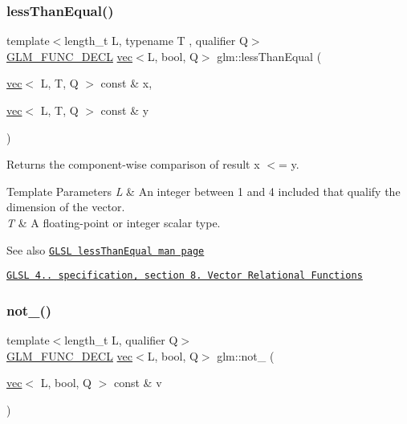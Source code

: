 \subsubsection{\texorpdfstring{less\+Than\+Equal()}{lessThanEqual()}}
{\footnotesize\ttfamily template$<$length\+\_\+t L, typename T , qualifier Q$>$ \\
\hyperlink{setup_8hpp_ab2d052de21a70539923e9bcbf6e83a51}{G\+L\+M\+\_\+\+F\+U\+N\+C\+\_\+\+D\+E\+CL} \hyperlink{structglm_1_1vec}{vec}$<$L, bool, Q$>$ glm\+::less\+Than\+Equal (\begin{DoxyParamCaption}\item[{\hyperlink{structglm_1_1vec}{vec}$<$ L, T, Q $>$ const \&}]{x,  }\item[{\hyperlink{structglm_1_1vec}{vec}$<$ L, T, Q $>$ const \&}]{y }\end{DoxyParamCaption})}

Returns the component-\/wise comparison of result x $<$= y.


\begin{DoxyTemplParams}{Template Parameters}
{\em L} & An integer between 1 and 4 included that qualify the dimension of the vector. \\
\hline
{\em T} & A floating-\/point or integer scalar type.\\
\hline
\end{DoxyTemplParams}
\begin{DoxySeeAlso}{See also}
\href{http://www.opengl.org/sdk/docs/manglsl/xhtml/lessThanEqual.xml}{\tt G\+L\+SL less\+Than\+Equal man page} 

\href{http://www.opengl.org/registry/doc/GLSLangSpec.4.20.8.pdf}{\tt G\+L\+SL 4.. specification, section 8. Vector Relational Functions} 
\end{DoxySeeAlso}
\mbox{\label{group__core__func__vector__relational_ga464f1392c934f69a917ab8bb6eda5b09}} 
\subsubsection{\texorpdfstring{not\+\_\+()}{not\_()}}
{\footnotesize\ttfamily template$<$length\+\_\+t L, qualifier Q$>$ \\
\hyperlink{setup_8hpp_ab2d052de21a70539923e9bcbf6e83a51}{G\+L\+M\+\_\+\+F\+U\+N\+C\+\_\+\+D\+E\+CL} \hyperlink{structglm_1_1vec}{vec}$<$L, bool, Q$>$ glm\+::not\+\_\+ (\begin{DoxyParamCaption}\item[{\hyperlink{structglm_1_1vec}{vec}$<$ L, bool, Q $>$ const \&}]{v }\end{DoxyParamCaption})}

